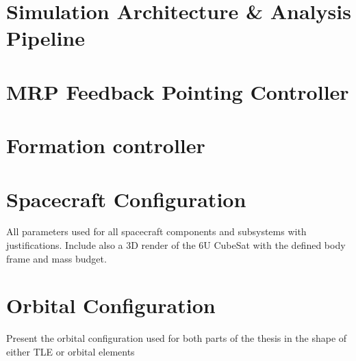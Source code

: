 \section{Simulation Architecture \& Analysis Pipeline}

\section{MRP Feedback Pointing Controller}

\section{Formation controller}

\section{Spacecraft Configuration}
All parameters used for all spacecraft components and subsystems with justifications. Include also a 3D render of the 6U CubeSat with the defined body frame and mass budget. 



\section{Orbital Configuration}
Present the orbital configuration used for both parts of the thesis in the shape of either TLE or orbital elements